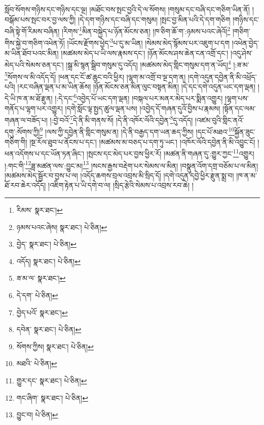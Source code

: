 སློབ་སོགས་གཉིས་དང་གཉིས་དང་ལྔ། །མཐོང་བས་སྤང་བྱའི་དེ་ལ་སོགས། །གསུམ་དང་བཞི་དང་གཅིག་ཡིན་ནོ། །བསྒོམ་པས་སྤང་བར་བྱ་ལས་ཀྱི། །དེ་དག་གཉིས་དང་བཞི་དང་གསུམ། །སྤང་བྱ་མིན་པའི་དེ་དག་གཅིག །གཉིས་དང་བཞི་སྟེ་གོ་རིམས་བཞིན། །རིགས་\footnote{རིམས་  སྣར་ཐང་། }མིན་བསྐྱེད་པ་ཉོན་མོངས་ཅན། །ཁ་ཅིག་ཆོ་ག་:ཉམས་པའང་ཞེའོ།\footnote{ཉམས་པའང་ཞེས།  སྣར་ཐང་།  པེ་ཅིན། } །གཅིག་གིས་སྐྱེ་བ་གཅིག་འཕེན་ཏོ། །ཡོངས་རྫོགས་ཕྱེད་\footnote{བྱེད་  སྣར་ཐང་།  པེ་ཅིན། }པ་དུ་མ་ཡིན། །སེམས་མེད་སྙོམས་པར་འཇུག་པ་དག །འཕེན་བྱེད་མ་ཡིན་ཐོབ་པའང་མིན། །མཚམས་མེད་པ་ཡི་ལས་རྣམས་དང་། །ཉོན་མོངས་ཤས་ཆེན་ངན་འགྲོ་དང་། །འདུ་ཤེས་མེད་པའི་སེམས་ཅན་དང་། །སྒྲ་མི་སྙན་སྒྲིབ་གསུམ་དུ་འདོད། །མཚམས་མེད་གླིང་གསུམ་དག་ན་ཡོད།\footnote{འདོད།  སྣར་ཐང་།  པེ་ཅིན། } །:ཟ་མ་\footnote{ཟ་མ་ལ་  སྣར་ཐང་། }སོགས་ལ་མི་འདོད་དོ། །ཕན་དང་ངོ་ཚ་ཆུང་བའི་ཕྱིར། །ལྷག་མ་འགྲོ་བ་ལྔ་དག་ན། །དགེ་འདུན་དབྱེན་ནི་མི་འཕྲོད་པའི། །རང་བཞིན་ལྡན་པ་མ་ཡིན་ཆོས། །ཉོན་མོངས་ཅན་མིན་ལུང་བསྟན་མིན། །དེ་དང་དགེ་འདུན་ཡང་དག་ལྡན། །དེ་ཡི་ཁ་ན་མ་ཐོ་རྫུན། །:དེ་དང་\footnote{དེ་དག་  པེ་ཅིན། }འབྱེད་པོ་ཡང་དག་ལྡན། །བསྐལ་པར་མནར་མེད་པར་སྨིན་འགྱུར། །ལྷག་པས་གནོད་པ་ལྷག་པར་འགྱུར། །དགེ་སློང་ལྟ་སྤྱད་ཚུལ་ལྡན་པས། །འབྱེད་དོ་གཞན་དུའོ་བྱིས་པ་རྣམས། །སྟོན་དང་ལམ་གཞན་ལ་བཟོད་པ། །:བྱེ་བའོ་\footnote{བྱེད་པའོ་  སྣར་ཐང་། }དེ་ནི་མི་གནས་སོ། །དེ་ནི་འཁོར་ལོའི་དབྱེན་\footnote{དབེན་  སྣར་ཐང་།  པེ་ཅིན། }དུ་འདོད། །འཛམ་བུའི་གླིང་ནའོ་དགུ་:སོགས་ཀྱི།\footnote{སོགས་ཀྱིས།  སྣར་ཐང་།  པེ་ཅིན། } །ལས་ཀྱི་དབྱེན་ནི་གླིང་གསུམ་ན། །དེ་ནི་བརྒྱད་དག་ཡན་ཆད་ཀྱིས། །དང་པོ་མཐའ་\footnote{མཐའི་  པེ་ཅིན། }སྐྱོན་ཟུང་གཅིག་གི། །སྔ་རོལ་ཐུབ་པ་ནོངས་པ་དང་། །མཚམས་མ་བཅད་པ་དག་ཏུ་ཡང་། །འཁོར་ལོའི་དབྱེན་ནི་མི་འབྱུང་ངོ། །ཕན་འདོགས་པ་དང་ཡོན་ཏན་ཞིང་། །སྤངས་དང་མེད་པར་བྱས་ཕྱིར་རོ། །མཚན་ནི་གཞན་དུ་:གྱུར་ཀྱང་\footnote{གྱུར་དང་  སྣར་ཐང་།  པེ་ཅིན། }འགྱུར། །:གང་གི་\footnote{གང་ཞིག་  སྣར་ཐང་།  པེ་ཅིན། }ཟླ་མཚན་ལས་:བྱུང་མ།\footnote{བྱུང་བ།  པེ་ཅིན། } །སངས་རྒྱས་བརྡེག་པར་སེམས་ལ་མིན། །བསྣུན་འོག་དགྲ་བཅོམ་པ་ལ་མིན། །མཚམས་མེད་སྦྱོར་བ་བྱས་པ་ལ། །འདོད་ཆགས་བྲལ་འབྲས་མི་སྲིད་དོ། །དགེ་འདུན་དབྱེ་ཕྱིར་རྫུན་སྨྲ་བ། །ཁ་ན་མ་ཐོ་རབ་ཆེར་འདོད། །འཇིག་རྟེན་པ་ཡི་དགེ་བ་ལ། །སྲིད་རྩེའི་སེམས་པ་འབྲས་རབ་ཆེ། །

